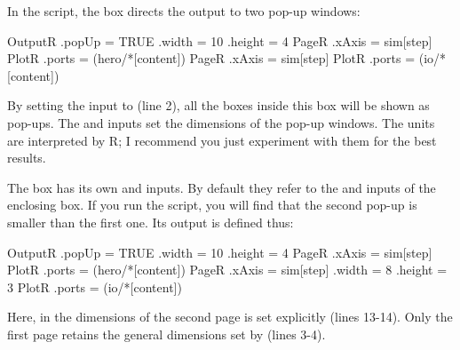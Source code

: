 In the  script, the  box directs the output to two pop-up windows:

\lstset{numbers=left}
\begin{boxscript}
OutputR {
	.popUp = TRUE
	.width = 10
	.height = 4
	PageR {
		.xAxis = sim[step]
		PlotR {
			.ports = (hero/*[content])
		}
	}
	PageR {
		.xAxis = sim[step]
		PlotR {
			.ports = (io/*[content])
		}
	}
}
\end{boxscript}
\lstset{numbers=none}

By setting the  input to  (line 2), all the  boxes inside this  box will be shown as pop-ups. The  and  inputs set the dimensions of the pop-up windows. The units are interpreted by R; I recommend you just experiment with them for the best results.

The  box has its own  and  inputs. By default they refer to the  and  inputs of the enclosing  box. If you run the  script, you will find that the second pop-up is smaller than the first one. Its output is defined thus:

\lstset{numbers=left}
\begin{boxscript}
OutputR {
	.popUp = TRUE
	.width = 10
	.height = 4
	PageR {
		.xAxis = sim[step]
		PlotR {
			.ports = (hero/*[content])
		}
	}
	PageR {
		.xAxis = sim[step]
		.width = 8
		.height = 3
		PlotR {
			.ports = (io/*[content])
		}
	}
}
\end{boxscript}
\lstset{numbers=none}

Here, in the dimensions of the second page is set explicitly (lines 13-14). Only the first page retains the general dimensions set by  (lines 3-4).


